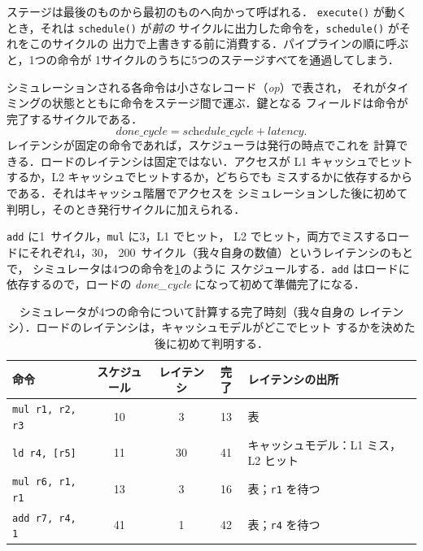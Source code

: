 \documentclass[../main.tex]{subfiles}
\begin{document}
ステージは最後のものから最初のものへ向かって呼ばれる．
\texttt{execute()} が動くとき，それは \texttt{schedule()} が\emph{前の}
サイクルに出力した命令を，\texttt{schedule()} がそれをこのサイクルの
出力で上書きする前に消費する．パイプラインの順に呼ぶと，1つの命令が
1サイクルのうちに5つのステージすべてを通過してしまう．

シミュレーションされる各命令は小さなレコード（\emph{op}）で表され，
それがタイミングの状態とともに命令をステージ間で運ぶ．鍵となる
フィールドは命令が完了するサイクルである．
\begin{equation}
  \textit{done\_cycle} = \textit{schedule\_cycle} + \textit{latency}.
  \label{eq:l08-done-cycle}
\end{equation}
レイテンシが固定の命令であれば，スケジューラは発行の時点でこれを
計算できる．ロードのレイテンシは固定ではない．アクセスが L1
キャッシュでヒットするか，L2 キャッシュでヒットするか，どちらでも
ミスするかに依存するからである．それはキャッシュ階層でアクセスを
シミュレーションした後に初めて判明し，そのとき発行サイクルに加えられる．

\begin{example}
  \label{ex:l08-done-cycle}
  \texttt{add} に\num{1}~サイクル，\texttt{mul} に\num{3}，L1 でヒット，
  L2 でヒット，両方でミスするロードにそれぞれ\num{4}，\num{30}，
  \num{200}~サイクル（我々自身の数値）というレイテンシのもとで，
  シミュレータは4つの命令を\cref{tab:l08-done-cycle}のように
  スケジュールする．\texttt{add} はロードに依存するので，ロードの
  \textit{done\_cycle} になって初めて準備完了になる．
\end{example}

\begin{table}[tb]
  \centering
  \caption{シミュレータが4つの命令について計算する完了時刻（我々自身の
    レイテンシ）．ロードのレイテンシは，キャッシュモデルがどこでヒット
    するかを決めた後に初めて判明する．}
  \label{tab:l08-done-cycle}
  \begin{tabular}{@{}l c c c >{\raggedright\arraybackslash}p{30mm}@{}}%
    \toprule
    命令 & スケジュール & レイテンシ & 完了 & レイテンシの出所 \\
    \midrule
    \texttt{mul r1, r2, r3} & 10 & 3 & 13 & 表 \\
    \texttt{ld r4, [r5]} & 11 & 30 & 41 & キャッシュモデル：L1 ミス，L2 ヒット \\
    \texttt{mul r6, r1, r1} & 13 & 3 & 16 & 表；\texttt{r1} を待つ \\
    \texttt{add r7, r4, 1} & 41 & 1 & 42 & 表；\texttt{r4} を待つ \\
    \bottomrule
  \end{tabular}
\end{table}
\end{document}
